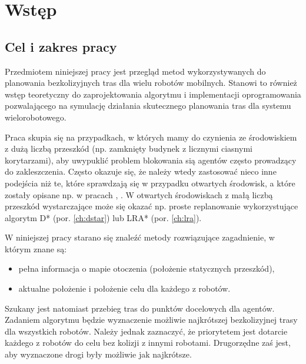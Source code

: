 \chapter{Wstęp}
\label{ch:wstep}

\section{Cel i zakres pracy}
Przedmiotem niniejszej pracy jest przegląd metod wykorzystywanych do planowania bezkolizyjnych tras dla wielu robotów mobilnych.
Stanowi to również wstęp teoretyczny do zaprojektowania algorytmu i implementacji oprogramowania pozwalającego na symulację działania skutecznego planowania tras dla systemu wielorobotowego.

Praca skupia się na przypadkach, w których mamy do czynienia ze środowiskiem z dużą liczbą przeszkód (np. zamknięty budynek z licznymi ciasnymi korytarzami), aby uwypuklić  problem blokowania sią agentów często prowadzący do zakleszczenia. Często okazuje się, że należy wtedy zastosować nieco inne podejścia niż te, które sprawdzają się w przypadku otwartych środowisk, a które zostały opisane np. w pracach \cite{roszkowska}, \cite{siemiatkowska}.
W otwartych środowiskach z małą liczbą przeszkód wystarczające może się okazać np. proste replanowanie wykorzystujące algorytm D* (por. \ref{ch:dstar}) lub LRA* (por. \ref{ch:lra}).

W niniejszej pracy starano się znaleźć metody rozwiązujące zagadnienie, w którym znane są:
\vspace{-1em}
\begin{itemize}[noitemsep]
	\item pełna informacja o mapie otoczenia (położenie statycznych przeszkód),
	\item aktualne położenie i położenie celu dla każdego z robotów.
\end{itemize}

Szukany jest natomiast przebieg tras do punktów docelowych dla agentów. Zadaniem algorytmu będzie wyznaczenie możliwie najkrótszej bezkolizyjnej trasy dla wszystkich robotów. Należy jednak zaznaczyć, że priorytetem jest dotarcie każdego z robotów do celu bez kolizji z innymi robotami. Drugorzędne zaś jest, aby wyznaczone drogi były możliwie jak najkrótsze.

\clearpage
